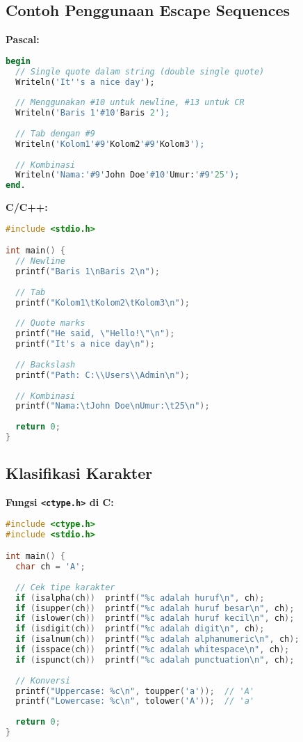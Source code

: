 \documentclass[../main.tex]{subfiles}
\begin{document}
\subsection{Contoh Penggunaan Escape Sequences}

\textbf{Pascal:}
\begin{lstlisting}[language=Pascal, caption={Escape sequences di Pascal}]
begin
  // Single quote dalam string (double single quote)
  Writeln('It''s a nice day');
  
  // Menggunakan #10 untuk newline, #13 untuk CR
  Writeln('Baris 1'#10'Baris 2');
  
  // Tab dengan #9
  Writeln('Kolom1'#9'Kolom2'#9'Kolom3');
  
  // Kombinasi
  Writeln('Nama:'#9'John Doe'#10'Umur:'#9'25');
end.
\end{lstlisting}

\textbf{C/C++:}
\begin{lstlisting}[language=C, caption={Escape sequences di C/C++}]
#include <stdio.h>

int main() {
  // Newline
  printf("Baris 1\nBaris 2\n");
  
  // Tab
  printf("Kolom1\tKolom2\tKolom3\n");
  
  // Quote marks
  printf("He said, \"Hello!\"\n");
  printf("It's a nice day\n");
  
  // Backslash
  printf("Path: C:\\Users\\Admin\n");
  
  // Kombinasi
  printf("Nama:\tJohn Doe\nUmur:\t25\n");
  
  return 0;
}
\end{lstlisting}

\subsection{Klasifikasi Karakter}

\textbf{Fungsi \texttt{<ctype.h>} di C:}
\begin{lstlisting}[language=C, caption={Klasifikasi karakter di C}]
#include <ctype.h>
#include <stdio.h>

int main() {
  char ch = 'A';
  
  // Cek tipe karakter
  if (isalpha(ch))  printf("%c adalah huruf\n", ch);
  if (isupper(ch))  printf("%c adalah huruf besar\n", ch);
  if (islower(ch))  printf("%c adalah huruf kecil\n", ch);
  if (isdigit(ch))  printf("%c adalah digit\n", ch);
  if (isalnum(ch))  printf("%c adalah alphanumeric\n", ch);
  if (isspace(ch))  printf("%c adalah whitespace\n", ch);
  if (ispunct(ch))  printf("%c adalah punctuation\n", ch);
  
  // Konversi
  printf("Uppercase: %c\n", toupper('a'));  // 'A'
  printf("Lowercase: %c\n", tolower('A'));  // 'a'
  
  return 0;
}
\end{lstlisting}
\end{document}
